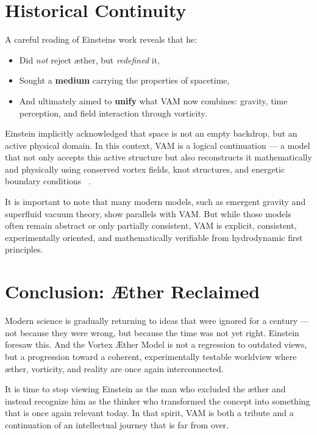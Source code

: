 
    \section{Historical Continuity}

    A careful reading of Einstein\rqs s work reveals that he:
    \begin{itemize}
        \item Did \emph{not} reject æther, but \emph{redefined} it,
        \item Sought a \textbf{medium} carrying the properties of spacetime,
        \item And ultimately aimed to \textbf{unify} what VAM now combines: gravity, time perception, and field interaction through vorticity.
    \end{itemize}

    Einstein implicitly acknowledged that space is not an empty backdrop, but an active physical domain. In this context, VAM is a logical continuation — a model that not only accepts this active structure but also reconstructs it mathematically and physically using conserved vortex fields, knot structures, and energetic boundary conditions~\cite{iskandarani2024vam1, iskandarani2024vam2}
.

    It is important to note that many modern models, such as emergent gravity and superfluid vacuum theory, show parallels with VAM. But while those models often remain abstract or only partially consistent, VAM is explicit, consistent, experimentally oriented, and mathematically verifiable from hydrodynamic first principles.

    \section*{Conclusion: Æther Reclaimed}

    Modern science is gradually returning to ideas that were ignored for a century — not because they were wrong, but because the time was not yet right. Einstein foresaw this. And the Vortex Æther Model is not a regression to outdated views, but a progression toward a coherent, experimentally testable worldview where æther, vorticity, and reality are once again interconnected.

    It is time to stop viewing Einstein as the man who excluded the æther and instead recognize him as the thinker who transformed the concept into something that is once again relevant today. In that spirit, VAM is both a tribute and a continuation of an intellectual journey that is far from over.
